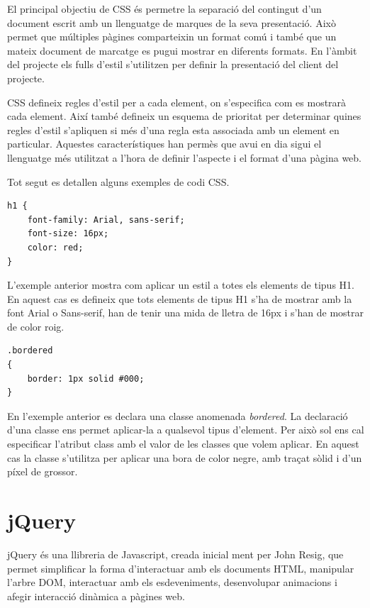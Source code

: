 El principal objectiu de CSS és permetre la separació del contingut d'un document escrit amb un llenguatge de marques de la seva presentació. Això permet que múltiples pàgines comparteixin un format comú i també que un mateix document de marcatge es pugui mostrar en diferents formats. En l'àmbit del projecte els fulls d'estil s'utilitzen per definir la presentació del client del projecte.

CSS defineix regles d'estil per a cada element, on s'especifica com es mostrarà cada element. Així també defineix un esquema de prioritat per determinar quines regles d'estil s'apliquen si més d'una regla esta associada amb un element en particular. Aquestes característiques han permès que avui en dia sigui el llenguatge més utilitzat a l'hora de definir l'aspecte i el format d'una pàgina web. 

Tot segut es detallen alguns exemples de codi CSS. 

\begin{lstlisting}
h1 {
    font-family: Arial, sans-serif; 
    font-size: 16px;
    color: red;
}
\end{lstlisting}

L'exemple anterior mostra com aplicar un estil a totes els elements de tipus H1. En aquest cas es defineix que tots elements de tipus H1 s'ha de mostrar amb la font Arial o Sans-serif, han de tenir una mida de lletra de 16px i s'han de mostrar de color roig.  

\begin{lstlisting}
.bordered
{
    border: 1px solid #000;
}
\end{lstlisting}

En l'exemple anterior es declara una classe anomenada \emph{bordered}. La declaració d'una classe ens permet aplicar-la a qualsevol tipus d'element. Per això sol ens cal especificar l'atribut class amb el valor de les classes que volem aplicar. En aquest cas la classe s'utilitza per aplicar una bora de color negre, amb traçat sòlid i d'un píxel de grossor. 

\section{jQuery}

jQuery és una llibreria de Javascript, creada inicial ment per John Resig, que permet simplificar la forma d'interactuar amb els documents HTML, manipular l'arbre DOM, interactuar amb els esdeveniments, desenvolupar animacions i afegir interacció dinàmica a pàgines web. 


